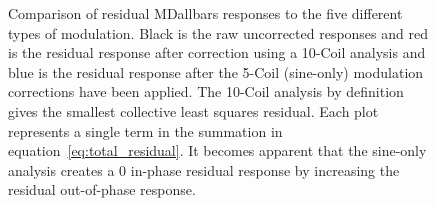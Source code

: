 \begin{figure}

\centering
{}
\caption{Comparison of residual MDallbars responses to the five different types of modulation. Black is the raw uncorrected responses and red is the residual response after correction using a 10-Coil analysis  and blue is the residual response after the 5-Coil (sine-only) modulation corrections have been applied. The 10-Coil analysis by definition gives the smallest collective least squares residual. Each plot represents a single term in the summation in equation~\ref{eq:total_residual}. It becomes apparent that the sine-only analysis creates a 0 in-phase residual response by increasing the residual out-of-phase response.}
\label{fig:10coil_and_sine_only_res}
\end{figure}

